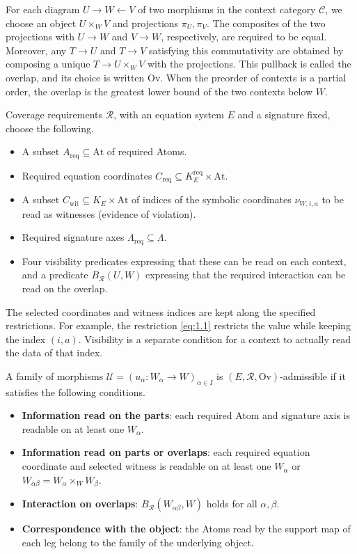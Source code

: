 \begin{definition}\label{def:1.19}

For each diagram $U\to W\leftarrow V$ of two morphisms in the context category
$\mathcal{C}$, we choose an object $U\times_W V$ and projections $\pi_U,\pi_V$.
The composites of the two projections with $U\to W$ and $V\to W$, respectively,
are required to be equal.
Moreover, any $T\to U$ and $T\to V$ satisfying this commutativity are obtained
by composing a unique $T\to U\times_W V$ with the projections.
This pullback is called the overlap, and its choice is written $\mathrm{Ov}$.
When the preorder of contexts is a partial order, the overlap is the greatest
lower bound of the two contexts below $W$.

Coverage requirements $\mathcal{R}$, with an equation system $E$ and a signature
fixed, choose the following.

\begin{itemize}
\item A subset $A_{\mathrm{req}}\subseteq\mathrm{At}$ of required Atoms.
\item Required equation coordinates
$C_{\mathrm{req}}\subseteq K_E^{\mathrm{req}}\times\mathrm{At}$.
\item A subset $C_{\mathrm{wit}}\subseteq K_E\times\mathrm{At}$ of indices of
the symbolic coordinates $\nu_{W,i,a}$ to be read as witnesses (evidence of
violation).
\item Required signature axes $\Lambda_{\mathrm{req}}\subseteq\Lambda$.
\item Four visibility predicates expressing that these can be read on each
context, and a predicate $B_{\mathcal{R}}(U,W)$ expressing that the required
interaction can be read on the overlap.
\end{itemize}

The selected coordinates and witness indices are kept along the specified
restrictions.
For example, the restriction \eqref{eq:1.1} restricts the value while keeping
the index $(i,a)$.
Visibility is a separate condition for a context to actually read the data of
that index.

A family of morphisms $\mathcal{U}=(u_\alpha:W_\alpha\to W)_{\alpha\in I}$ is
$(E,\mathcal{R},\mathrm{Ov})$-admissible if it satisfies the following
conditions.

\begin{itemize}
\item \textbf{Information read on the parts}: each required Atom and signature
axis is readable on at least one $W_\alpha$.
\item \textbf{Information read on parts or overlaps}: each required equation
coordinate and selected witness is readable on at least one $W_\alpha$ or
$W_{\alpha\beta}=W_\alpha\times_W W_\beta$.
\item \textbf{Interaction on overlaps}: $B_{\mathcal{R}}(W_{\alpha\beta},W)$
holds for all $\alpha,\beta$.
\item \textbf{Correspondence with the object}: the Atoms read by the support map
of each leg belong to the family of the underlying object.
\end{itemize}


\end{definition}
